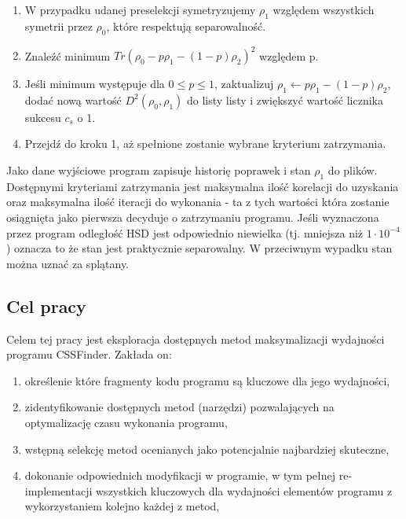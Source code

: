 \documentclass[11pt, a4paper]{article}
\begin{document}
\begin{sloppypar}
\begin{enumerate}
      \item W przypadku udanej preselekcji symetryzujemy $\rho_{1}$ względem wszystkich symetrii
        przez $\rho_{0}$, które respektują separowalność.

      \item Znaleźć minimum $Tr(\rho_{0}- p\rho_{1}- (1 - p)\rho_{2})^{2}$ względem p.

      \item Jeśli minimum występuje dla $0 \le p \le 1$, zaktualizuj
        $\rho_{1}\leftarrow p\rho_{1}- (1 - p)\rho_{2}$, dodać nową wartość $D^{2}(\rho_{0}
        , \rho_{1})$ do listy listy i zwiększyć wartość licznika sukcesu $c_{s}$ o 1.

      \item Przejdź do kroku 1, aż spełnione zostanie wybrane kryterium zatrzymania.
    \end{enumerate}

    Jako dane wyjściowe program zapisuje historię poprawek i stan $\rho_{1}$ do plików.
    Dostępnymi kryteriami zatrzymania jest maksymalna ilość korelacji do uzyskania oraz
    maksymalna ilość iteracji do wykonania - ta z tych wartości która zostanie
    osiągnięta jako pierwsza decyduje o zatrzymaniu programu. Jeśli wyznaczona przez program
    odległość HSD jest odpowiednio niewielka (tj. mniejsza niż $1 \cdot 10^{-4}$)
    oznacza to że stan jest praktycznie separowalny. W przeciwnym wypadku stan można uznać
    za splątany.

    \subsection{Cel pracy}
    Celem tej pracy jest eksploracja dostępnych metod maksymalizacji wydajności programu
    CSSFinder. Zakłada on:
    \begin{enumerate}
      \item określenie które fragmenty kodu programu są kluczowe dla jego wydajności,

      \item zidentyfikowanie dostępnych metod (narzędzi) pozwalających na optymalizację czasu
        wykonania programu,

      \item wstępną selekcję metod ocenianych jako potencjalnie najbardziej skuteczne,

      \item dokonanie odpowiednich modyfikacji w programie, w tym pełnej re-implementacji
        wszystkich kluczowych dla wydajności elementów programu z wykorzystaniem kolejno
        każdej z metod,


\end{enumerate}
\end{sloppypar}
\end{document}
